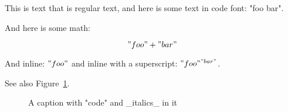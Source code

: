 \documentclass{article}
\begin{document}
This is text that is regular text, and here is some text in code font: "foo bar".

And here is some math:

\[
    "foo" + "bar"
\]

And inline: $"foo"$ and inline with a superscript: $"foo"^{"bar"}$.

See also Figure~\ref{fig}.

\begin{figure}
\caption{A caption with "code" and _italics_ in it}
\label{fig}
\end{figure}
\end{document}
